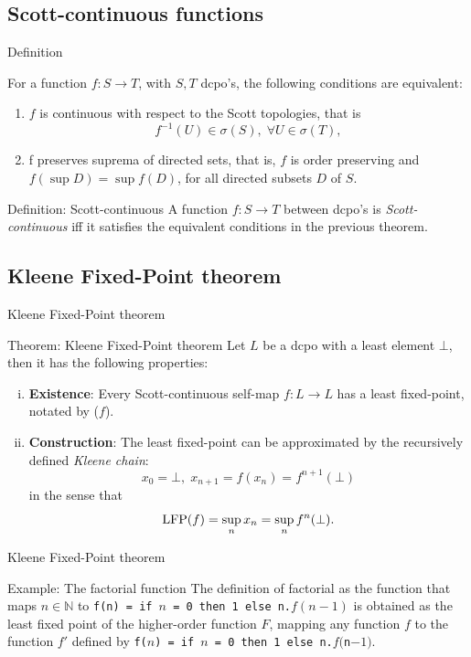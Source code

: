 \documentclass{beamer}
\newcommand{\N}{\mathbb{N}}
\newcommand{\LFP}{\text{LFP}}
\begin{document}
\subsection{Scott-continuous functions}
\begin{frame}{Definition}
\begin{theorem}
For a function $f: S \rightarrow T$, with $S,T$ dcpo's, the following conditions are equivalent:
\begin{enumerate}
    \item $f$ is continuous with respect to the Scott topologies, that is $$f^{-1}(U) \in \sigma(S),\; \forall U \in \sigma(T),$$
    \item f preserves suprema of directed sets, that is, $f$ is order preserving and $f(\sup D) = \sup f(D)$, for all directed subsets $D$ of $S$.
\end{enumerate}
\end{theorem}

\begin{block}{Definition: Scott-continuous}
A function $f: S \rightarrow T$ between dcpo's is \emph{Scott-continuous} iff it satisfies the equivalent conditions in the previous theorem.
\end{block}
\end{frame}
\subsection{Kleene Fixed-Point theorem}
\begin{frame}{Kleene Fixed-Point theorem}
\begin{block}{Theorem: Kleene Fixed-Point theorem} Let $L$ be a dcpo with a least element $\bot$, then it has the following properties:
\begin{enumerate}[(i)]
  \item \textbf{Existence}: Every Scott-continuous self-map $f: L \rightarrow L$ has a least fixed-point, notated by \LFP($f$).
  \item \textbf{Construction}: The least fixed-point can be approximated by the recursively defined \emph{Kleene chain}:
      $$x_0 = \bot, \; x_{n+1} = f(x_n) = f^{n+1}(\bot)$$
      in the sense that
      $$\text{\LFP}(f) = \sup_n x_n = \sup_n f^n(\bot).$$
\end{enumerate}
\end{block}

\end{frame}

\begin{frame}{Kleene Fixed-Point theorem}
\begin{block}{Example: The factorial function}
The definition of factorial as the function that maps $n \in \N$ to \texttt{f(n) = if $n$ = 0 then 1 else n.$f(n-1)$} is obtained as the least fixed point of the higher-order function $F$, mapping any function $f$ to the function $f'$ defined by \texttt{f($n$) = if $n$ = 0 then 1 else n.$f($n$-1)$}.
\end{block}
\end{frame}
\end{document}
